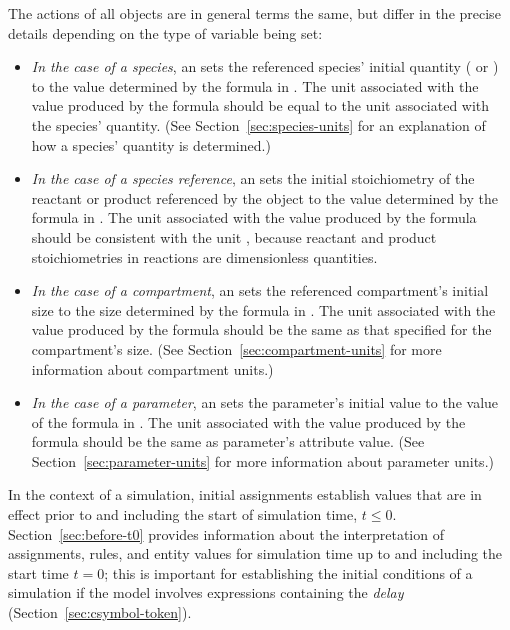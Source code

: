 The actions of all \InitialAssignment objects are in general terms
the same, but differ in the precise details depending on the type
of variable being set:
\begin{itemize}

\item \emph{In the case of a species}, an \InitialAssignment sets
  the referenced species' initial quantity
  ( or ) to the value
  determined by the formula in .  The unit associated
  with the value produced by the  formula should be
  equal to the unit associated with the species' quantity.  (See
  Section~\ref{sec:species-units} for an explanation of how a
  species' quantity is determined.)

\item \emph{In the case of a species reference}, an
  \InitialAssignment sets the initial stoichiometry of the
  reactant or product referenced by the \SpeciesReference object
  to the value determined by the formula in .  The
  unit associated with the value produced by the 
  formula should be consistent with the unit
  , because reactant and product
  stoichiometries in reactions are dimensionless quantities.

\item \emph{In the case of a compartment}, an \InitialAssignment
  sets the referenced compartment's initial size to the size
  determined by the formula in .  The unit associated
  with the value produced by the  formula should be
  the same as that specified for the compartment's size.  (See
  Section~\ref{sec:compartment-units} for more information about
  compartment units.)

\item \emph{In the case of a parameter}, an \InitialAssignment
  sets the parameter's initial value to the value of the formula
  in .  The unit associated with the value produced by
  the  formula should be the same as parameter's
   attribute value.  (See
  Section~\ref{sec:parameter-units} for more information about
  parameter units.)

\end{itemize}

In the context of a simulation, initial assignments establish
values that are in effect prior to and including the start of
simulation time, \ie $t \leq 0$.  Section~\ref{sec:before-t0}
provides information about the interpretation of assignments,
rules, and entity values for simulation time up to and including
the start time $t = 0$; this is important for establishing the
initial conditions of a simulation if the model involves
expressions containing the \emph{delay} 
(Section~\ref{sec:csymbol-token}).

